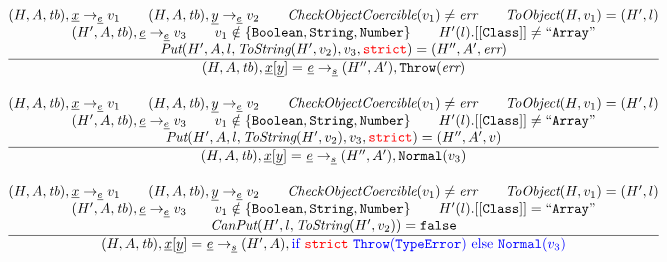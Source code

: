 \[
\begin{array}{l@{~~}l@{~~}ll}


\frac{\begin{matrix}
\evale, \irid \rightarrow_{\ir\expr} v_1
\rulesep
\evale, \ir{y} \rightarrow_{\ir\expr} v_2
\rulesep
\hf{CheckObjectCoercible}(v_1) \not= \err
\rulesep
\hf{ToObject}(H, v_1) = (H',l)
\\
(H', A, \tb), \irexpr \rightarrow_{\ir\expr} v_3
\rulesep
v_1 \notin \{{\tt Boolean, String, Number}\}
\rulesep
H'(l).[[{\tt Class}]] \not= {\tt``Array"} 
\\
\hf{Put}(H', A, l, \hf{ToString}(H', v_2), v_3, \strict) = (H'', A', \err)
\end{matrix}}{\begin{matrix}
\state, \irid{\tt[}\ir{y}{\tt] =} \ \irexpr \rightarrow_{\ir\stmt}
(H'',A'), {\tt Throw}(\err)
\end{matrix}}
\\[2em]


\frac{\begin{matrix}
\evale, \irid \rightarrow_{\ir\expr} v_1
\rulesep
\evale, \ir{y} \rightarrow_{\ir\expr} v_2
\rulesep
\hf{CheckObjectCoercible}(v_1) \not= \err
\rulesep
\hf{ToObject}(H, v_1) = (H',l)
\\
(H', A, \tb), \irexpr \rightarrow_{\ir\expr} v_3
\rulesep
v_1 \notin \{{\tt Boolean, String, Number}\}
\rulesep
H'(l).[[{\tt Class}]] \not= {\tt``Array"} 
\\
\hf{Put}(H', A, l, \hf{ToString}(H', v_2), v_3, \strict) = (H'', A', v)
\end{matrix}}{\begin{matrix}
\state, \irid{\tt[}\ir{y}{\tt] =} \ \irexpr \rightarrow_{\ir\stmt}
(H'',A'), {\tt Normal}(v_3)
\end{matrix}}
\\[2em]


\frac{\begin{matrix}
\evale, \irid \rightarrow_{\ir\expr} v_1
\rulesep
\evale, \ir{y} \rightarrow_{\ir\expr} v_2
\rulesep
\hf{CheckObjectCoercible}(v_1) \not= \err
\rulesep
\hf{ToObject}(H, v_1) = (H',l)
\\
(H', A, \tb), \irexpr \rightarrow_{\ir\expr} v_3
\rulesep
v_1 \notin \{{\tt Boolean, String, Number}\}
\rulesep
H'(l).[[{\tt Class}]] = {\tt``Array"}%
\\
\hf{CanPut}(H', l, \hf{ToString}(H', v_2)) = \false
\end{matrix}}{\begin{matrix}
\state, \irid{\tt[}\ir{y}{\tt] =} \ \irexpr \rightarrow_{\ir\stmt}
(H',A), \reject
\end{matrix}}
\\[2em]








\end{array}\]
